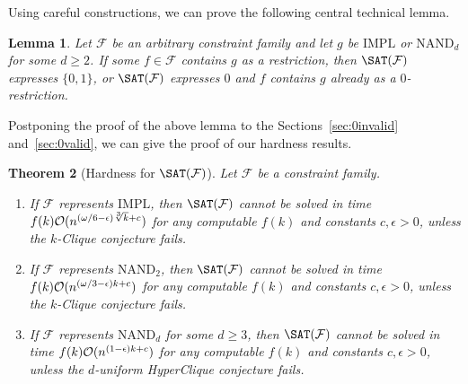 \documentclass[10pt,a4paper]{article}
\theoremstyle{plain}
\newtheorem{thm}{Theorem}[section]
\newtheorem{lem}[thm]{Lemma}
\newcommand{\Oh}{{\cal O}}
\newcommand{\NAND}{\mathrm{NAND}}
\newcommand{\Impl}{\mathrm{IMPL}}
\newcommand{\confam}{\mathcal{F}}
\newcommand{\eps}{\epsilon}
\begin{document}
  Using careful constructions, we can prove the following central technical lemma.
%
\begin{lem}\label{lem:representingconstants}
Let $\confam$ be an arbitrary constraint family and let $g$ be $\Impl$ or $\NAND_d$ for some $d\ge 2$. If some $f\in \confam$ contains $g$ as a restriction, then $\SAT(\confam)$ expresses $\{0,1\}$, or $\SAT(\confam)$ expresses $0$ and $f$ contains $g$ already as a $0$-restriction.
\end{lem}
%
Postponing the proof of the above lemma to the Sections~\ref{sec:0invalid} and~\ref{sec:0valid}, we can give the proof of our hardness results.
%
\begin{thm}[Hardness for $\SAT(\confam)$]
Let $\confam$ be a constraint family.
\begin{enumerate}
\item If $\confam$ represents $\Impl$, then $\SAT(\confam)$ cannot be solved in time $f(k)\Oh(n^{(\omega/6-\eps)\sqrt[3]{k}+c})$ for any computable $f(k)$ and constants $c, \eps > 0$, unless the $k$-Clique conjecture fails.
\item If $\confam$ represents $\NAND_{2}$, then $\SAT(\confam)$ cannot be solved in time $f(k)\Oh(n^{(\omega/3-\eps)k+c})$ for any computable $f(k)$ and constants $c, \eps > 0$, unless the $k$-Clique conjecture fails. 
\item If $\confam$ represents $\NAND_{d}$ for some $d\ge 3$, then $\SAT(\confam)$ cannot be solved in time $f(k)\Oh(n^{(1-\eps)k+c})$ for any computable $f(k)$ and constants $c, \eps > 0$, unless the $d$-uniform HyperClique conjecture fails. 
\end{enumerate}
\end{thm}
\end{document}
